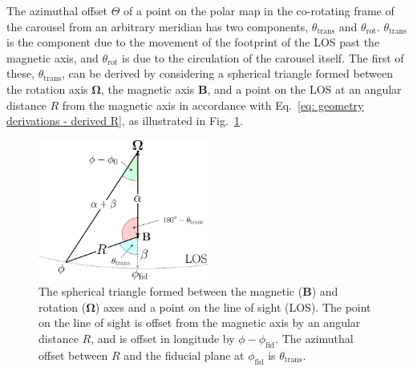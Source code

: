 The azimuthal offset $\Theta$ of a point on the polar map in the co-rotating frame of the carousel from an arbitrary meridian has two components, $\theta_\mathrm{trans}$ and $\theta_\mathrm{rot}$. $\theta_\mathrm{trans}$ is the component due to the movement of the footprint of the LOS past the magnetic axis, and $\theta_\mathrm{rot}$ is due to the circulation of the carousel itself. The first of these, $\theta_\mathrm{trans}$, can be derived by considering a spherical triangle formed between the rotation axis $\mathbf{\Omega}$, the magnetic axis $\mathbf{B}$, and a point on the LOS at an angular distance $R$ from the magnetic axis in accordance with Eq.~\eqref{eq: geometry derivations - derived R}, as illustrated in Fig.~\ref{fig: geometry derivations - theta trans triangle}.
\begin{figure}
    \begin{center}
        \includegraphics[width=0.5\textwidth]{Figures/geometry_appendix/theta_trans}
        \caption[The spherical triangle that describes pulsar geometry]{The spherical triangle formed between the magnetic ($\mathbf{B}$) and rotation ($\mathbf{\Omega}$) axes and a point on the line of sight (LOS). The point on the line of sight is offset from the magnetic axis by an angular distance $R$, and is offset in longitude by $\phi - \phi_\mathrm{fid}$. The azimuthal offset between $R$ and the fiducial plane at $\phi_\mathrm{fid}$ is $\theta_\mathrm{trans}$.}
        \label{fig: geometry derivations - theta trans triangle}
    \end{center}
\end{figure}

